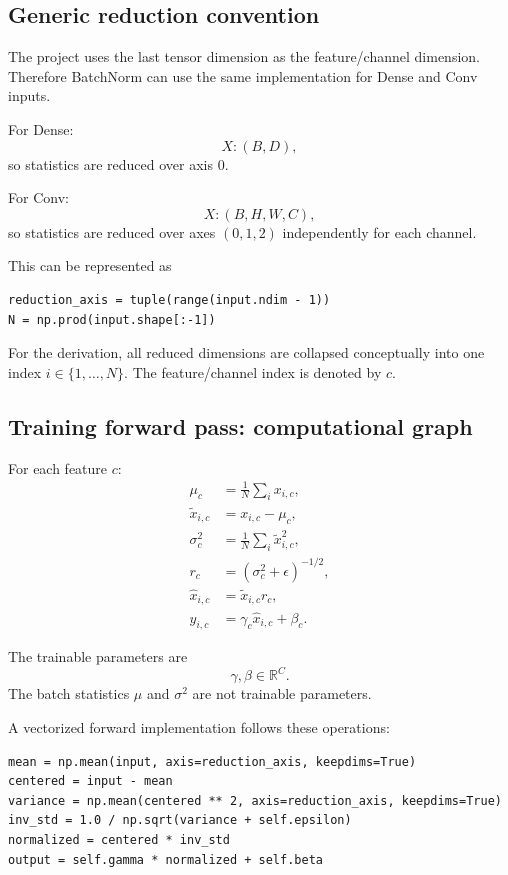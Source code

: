 \documentclass[11pt,a4paper]{article}
\newcommand{\R}{\mathbb{R}}
\begin{document}
\subsection{Generic reduction convention}

The project uses the last tensor dimension as the feature/channel dimension. Therefore BatchNorm can use the same implementation for Dense and Conv inputs.

For Dense:
\[
X:(B,D),
\]
so statistics are reduced over axis $0$.

For Conv:
\[
X:(B,H,W,C),
\]
so statistics are reduced over axes $(0,1,2)$ independently for each channel.

This can be represented as
\begin{lstlisting}
reduction_axis = tuple(range(input.ndim - 1))
N = np.prod(input.shape[:-1])
\end{lstlisting}

For the derivation, all reduced dimensions are collapsed conceptually into one index $i\in\{1,\ldots,N\}$. The feature/channel index is denoted by $c$.

\subsection{Training forward pass: computational graph}

For each feature $c$:
\begin{align}
\mu_c &= \frac{1}{N}\sum_i x_{i,c},\\
\tilde{x}_{i,c} &= x_{i,c}-\mu_c,\\
\sigma_c^2 &= \frac{1}{N}\sum_i \tilde{x}_{i,c}^2,\\
r_c &= (\sigma_c^2+\epsilon)^{-1/2},\\
\hat{x}_{i,c} &= \tilde{x}_{i,c}r_c,\\
y_{i,c} &= \gamma_c\hat{x}_{i,c}+\beta_c.
\end{align}

The trainable parameters are
\[
\gamma,\beta\in\R^C.
\]
The batch statistics $\mu$ and $\sigma^2$ are not trainable parameters.

A vectorized forward implementation follows these operations:
\begin{lstlisting}
mean = np.mean(input, axis=reduction_axis, keepdims=True)
centered = input - mean
variance = np.mean(centered ** 2, axis=reduction_axis, keepdims=True)
inv_std = 1.0 / np.sqrt(variance + self.epsilon)
normalized = centered * inv_std
output = self.gamma * normalized + self.beta
\end{lstlisting}
\end{document}
